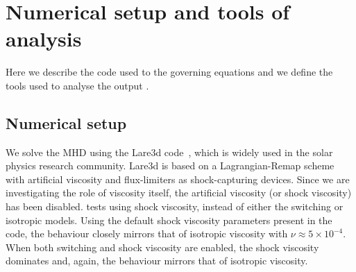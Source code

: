 
\section{Numerical setup and tools of analysis}
\label{sec:general-numerical-setup}

Here we describe the  code used to  the
governing equations and we define the  tools used to
analyse the  output .

\subsection{Numerical setup}

We solve the  MHD  using the Lare3d
code~\cite{arberStaggeredGridLagrangian2001}, which is widely used in
the solar physics research community. Lare3d is based on a
Lagrangian-Remap scheme with artificial viscosity and flux-limiters as
shock-capturing devices. Since we are investigating the role of
viscosity itself, the artificial viscosity (or shock viscosity) has been disabled.  tests
using shock viscosity, instead of either the switching or isotropic models. Using the default shock viscosity parameters present in the code, the behaviour closely mirrors that of isotropic viscosity with $\nu\approx 5\times10^{-4}$. When both switching and shock viscosity are enabled, the shock viscosity dominates and, again, the behaviour mirrors that of isotropic viscosity.

